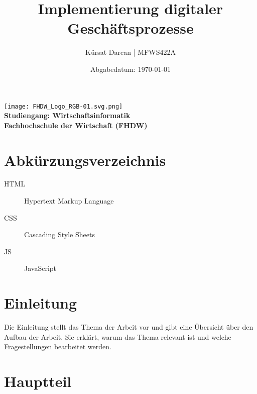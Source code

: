 \documentclass[a4paper,12pt]{article}
\title{\textbf{Implementierung digitaler Geschäftsprozesse}}
\author{Kürsat Darcan | MFWS422A}
\date{Abgabedatum: \today}
\begin{document}
\maketitle
\thispagestyle{empty}
\vspace{2cm}
\begin{center}
    \texttt{[image: FHDW\_Logo\_RGB-01.svg.png]} %
    \\
    \vspace{1cm}
    \textbf{Studiengang: Wirtschaftsinformatik}\\
    \textbf{Fachhochschule der Wirtschaft (FHDW)}
\end{center}
\newpage

\renewcommand{\thepage}{\roman{page}} %
\tableofcontents
\newpage

\listoffigures
{}
\newpage

\listoftables
{}
\newpage

\section*{Abkürzungsverzeichnis}
\begin{description}
    \item[HTML] Hypertext Markup Language
    \item[CSS] Cascading Style Sheets
    \item[JS] JavaScript
\end{description}
\newpage

\renewcommand{\thepage}{\arabic{page}} %
\setcounter{page}{1}


\section{Einleitung}
Die Einleitung stellt das Thema der Arbeit vor und gibt eine Übersicht über den Aufbau der Arbeit. Sie erklärt, warum das Thema relevant ist und welche Fragestellungen bearbeitet werden.

\section{Hauptteil}
\end{document}
